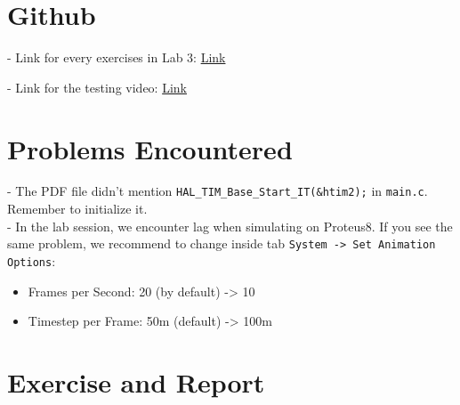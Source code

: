 \section{Github}
- Link for every exercises in Lab 3: \href{https://github.com/Lmonk555/lab03_micro_process_control.git}{Link}

- Link for the testing video: \href{https://drive.google.com/file/d/1MUBsJ7rMVX56908bq_3bAQ5zY5j9nRom/view?usp=sharing}{Link}


\section{Problems Encountered}
- The PDF file didn't mention \texttt{HAL\_TIM\_Base\_Start\_IT(\&htim2);} in \texttt{main.c}. Remember to initialize it.\\

- In the lab session, we encounter lag when simulating on Proteus8. If you see the same problem, we recommend to change inside tab \texttt{System   ->  Set Animation Options}:
\begin{itemize}
    \item Frames per Second: 20 (by default)    ->  10
    \item Timestep per Frame: 50m (default)     ->  100m
\end{itemize}





\section{Exercise and Report}





